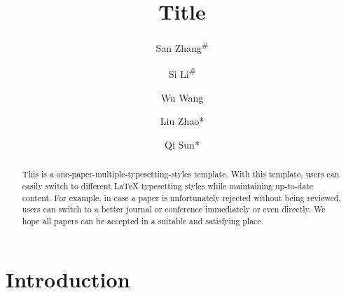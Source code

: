 \documentclass[sigconf]{acmart}
\begin{document}
\title{Title}

\author{San Zhang\textsuperscript{\#}}

\author{Si Li\textsuperscript{\#}}

\author{Wu Wang}

\author{Liu Zhao*}

\author{Qi Sun*}

\renewcommand{\shortauthors}{Zhang S, Li S, Wang W, et al. }

\begin{abstract}
	This is a one-paper-multiple-typesetting-styles template. With this template, users can easily switch to different LaTeX typesetting styles while maintaining up-to-date content. For example, in case a paper is unfortunately rejected without being reviewed, users can switch to a better journal or conference immediately or even directly. We hope all papers can be accepted in a suitable and satisfying place. 
\end{abstract}



\maketitle

\renewcommand{\thefootnote}{}

\section{Introduction}
\label{sec:1}
\end{document}
